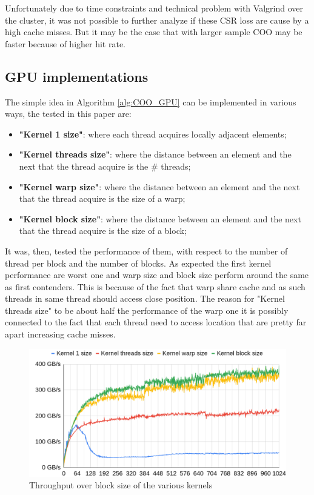 \documentclass[conference]{IEEEtran}
\begin{document}
\FloatBarrier
Unfortunately due to time constraints and technical problem with Valgrind over the cluster, it was not possible to further analyze if these CSR loss are cause by a high cache misses. But it may be the case that with larger sample COO may be faster because of higher hit rate.

\subsection{GPU implementations}
The simple idea in Algorithm \ref{alg:COO_GPU} can be implemented in various ways, the tested in this paper are:
\begin{itemize}
	\item \textbf{"Kernel 1 size"}: where each thread acquires locally adjacent elements;
	\item \textbf{"Kernel threads size"}: where the distance between an element and the next that the thread acquire is the \# threads;
	\item \textbf{"Kernel warp size"}: where the distance between an element and the next that the thread acquire is the size of a warp;
	\item \textbf{"Kernel block size"}: where the distance between an element and the next that the thread acquire is the size of a block;
\end{itemize}

It was, then, tested the performance of them, with respect to the number of thread per block and the number of blocks. As expected the first kernel performance are worst one and warp size and block size perform around the same as first contenders. This is because of the fact that warp share cache and as such threads in same thread should access close position. The reason for "Kernel threads size" to be about half the performance of the warp one it is possibly connected to the fact that each thread need to access location that are pretty far apart increasing cache misses.

\begin{figure}[hbt!]
	\centering
	\includegraphics[width=1\linewidth]{data_images/Gb_for_size_block}
	\caption{Throughput over block size of the various kernels }
	\label{fig:gbforsizeblock}
\end{figure}
\end{document}
